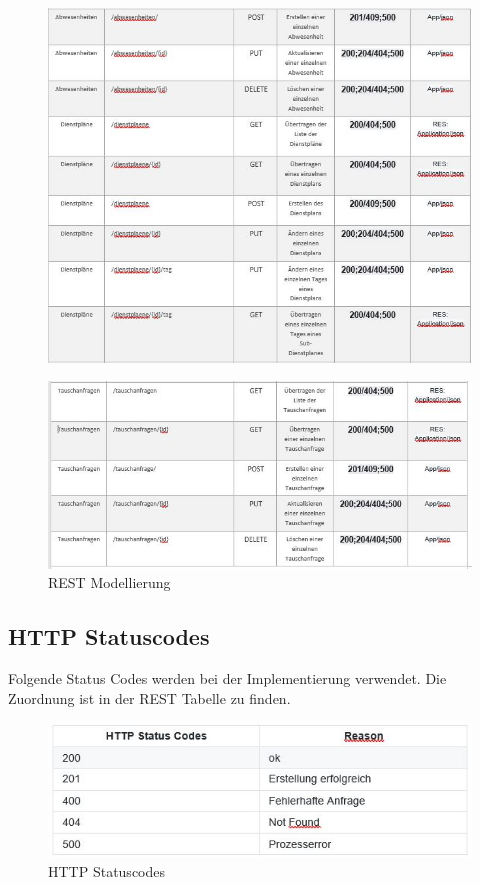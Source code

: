 \documentclass[11pt,
paper=a4,
bibtotocnumbered,	  %
liststotocnumbered,  %
DIV=calc,		  %
tablecaptionabove,	  %
headinclude,
]{article}
\begin{document}
\begin{figure}[H]
\includegraphics[width=1\textwidth]{Bilder/Rest2.jpg}
\end{figure}
\begin{figure}[H]
\includegraphics[width=1\textwidth]{Bilder/Rest3.jpg}
\caption{REST Modellierung}
\end{figure}
\subsection{HTTP Statuscodes}
Folgende Status Codes werden bei der Implementierung verwendet. Die Zuordnung ist in der REST Tabelle zu finden.
\begin{figure}[H]
\includegraphics[width=1\textwidth]{Bilder/status.jpg}
\caption{HTTP Statuscodes}
\end{figure}
\end{document}
